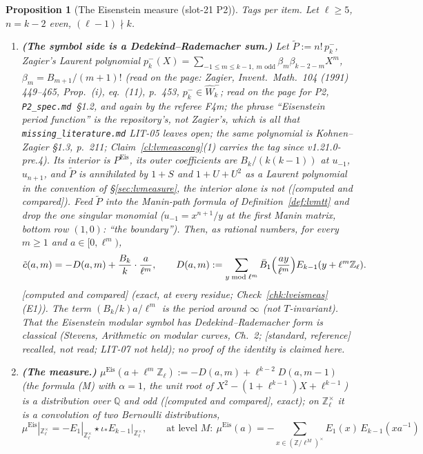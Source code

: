 \documentclass[11pt]{article}
\newtheorem{proposition}[theorem]{Proposition}
\theoremstyle{remark}
\newcommand{\Z}{\mathbb{Z}}
\newcommand{\Q}{\mathbb{Q}}
\newcommand{\STD}{\textsf{[standard, reference]}}
\newcommand{\CMPD}{\textsf{[computed and compared]}}   %
\begin{document}
\begin{proposition}[The Eisenstein measure (slot-21 P2)]\label{prop:lveismeas}
Tags per item. Let $\ell\ge5$, $n=k-2$ even, $(\ell-1)\nmid k$.
\begin{enumerate}
\item \textbf{(The symbol side is a Dedekind--Rademacher sum.)} Let $\tilde P:=n!\,p_k^{-}$, Zagier's Laurent polynomial $p_k^{-}(X)=\sum_{-1\le m\le k-1,\ m\text{ odd}}\beta_m\beta_{k-2-m}X^{m}$,
  $\beta_m=B_{m+1}/(m+1)!$ (read on the page: Zagier, Invent.\ Math.\ 104 (1991) 449--465, Prop.~(i), eq.~(11), p.~453, $p_k^{-}\in\hat W_k^{-}$; read on the page for P2, \texttt{P2\_spec.md}~\S1.2, and again by the referee F4m;
  the phrase ``Eisenstein period function'' is the repository's, not Zagier's, which is all that \texttt{missing\_literature.md} LIT-05 leaves open; the same polynomial is Kohnen--Zagier \S1.3,
  p.~211; Claim~\ref{cl:lvmeascong}(1) carries the tag since v1.21.0-pre.4). Its interior is $P^{\mathrm{Eis}}$, its outer coefficients are
  $B_k/(k(k-1))$ at $u_{-1}$, $u_{n+1}$, and $\tilde P$ is annihilated by $1+S$ and $1+U+U^{2}$ as a Laurent polynomial in the convention of \S\ref{sec:lvmeasure}, the interior alone is not (\CMPD).
  Feed $\tilde P$ into the Manin-path formula of Definition~\ref{def:lvmtt} and drop the one singular monomial ($u_{-1}=x^{n+1}/y$ at the first Manin matrix, bottom row $(1,0)$: ``the boundary''). Then,
  \emph{as rational numbers}, for every $m\ge1$ and $a\in[0,\ell^{m})$,
  \[
    \tilde c(a,m)=-D(a,m)+\frac{B_k}{k}\cdot\frac{a}{\ell^{m}},\qquad D(a,m):=\sum_{y\bmod\ell^{m}}\bar B_1\Bigl(\frac{ay}{\ell^{m}}\Bigr)E_{k-1}(y+\ell^{m}\Z_\ell).
  \]
  \CMPD{} (exact, at every residue; Check~\ref{chk:lveismeas}(E1)). The term $(B_k/k)a/\ell^{m}$ is the period around $\infty$ (not $T$-invariant). That the Eisenstein modular symbol has
  Dedekind--Rademacher form is classical (Stevens, \emph{Arithmetic on modular curves}, Ch.~2; \STD{} recalled, not read; LIT-07 not held); no proof of the identity is claimed here.
\item \textbf{(The measure.)} $\mu^{\mathrm{Eis}}(a+\ell^{m}\Z_\ell):=-D(a,m)+\ell^{k-2}D(a,m-1)$ (the formula (M) with $\alpha=1$, the unit root of $X^{2}-(1+\ell^{k-1})X+\ell^{k-1}$) is a
  distribution over $\Q$ and odd (\CMPD, exact); on $\Z_\ell^{\times}$ it is a convolution of two Bernoulli distributions,
  \[
    \mu^{\mathrm{Eis}}|_{\Z_\ell^{\times}}=-E_1|_{\Z_\ell^{\times}}\star\iota_\ast E_{k-1}|_{\Z_\ell^{\times}},\qquad\text{at level }M:\ \mu^{\mathrm{Eis}}(a)=-\sum_{x\in(\Z/\ell^{M})^{\times}}E_1(x)\,E_{k-1}(xa^{-1})
\]
\end{enumerate}
\end{proposition}
\end{document}
